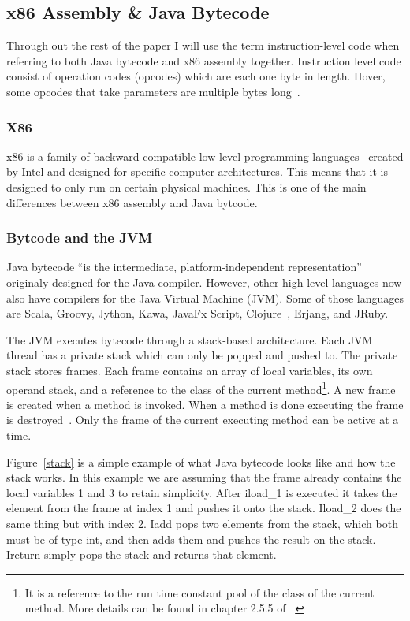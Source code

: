 \documentclass{sig-alternate}
\begin{document}
\subsection{x86 Assembly \& Java Bytecode}


Through out the rest of the paper I will use the term instruction-level code when referring to both Java bytecode and x86 assembly together. Instruction level code consist of operation codes (opcodes) which are each one byte in length. Hover, some opcodes that take parameters are multiple bytes long~\cite{JavaBytecode:2014,x86tomachine:2013}.

\subsubsection{X86}
x86 is a family of backward compatible low-level programming languages~\cite{x86assembly:2014} created by Intel and designed for specific computer architectures. This means that it is designed to only run on certain physical machines. This is one of the main differences between x86 assembly and Java bytcode. 

\subsubsection{ Bytcode and the JVM}
Java bytecode ``is the intermediate, platform-independent representation''~\cite{FINCH2:2009} originaly designed for the Java compiler. However, other high-level languages now also have compilers for the Java Virtual Machine (JVM). Some of those languages are Scala, Groovy, Jython, Kawa, JavaFx Script, Clojure~\cite{FINCH:2011}, Erjang, and JRuby.

The JVM executes bytecode through a stack-based architecture. Each JVM thread has a private stack which can only be popped and pushed to. The private stack stores frames. Each frame contains an array of local variables, its own operand stack, and a reference to the class of the current method\footnote{It is a reference to the run time constant pool of the class of the current method. More details can be found in chapter 2.5.5 of ~\cite{JVMspec:2013}}. A new frame is created when a method is invoked. When a method is done executing the frame is destroyed~\cite{Oracle:2013}. Only the frame of the current executing method can be active at a time.

Figure~\ref{stack} is a simple example of what Java bytecode looks like and how the stack works. In this example we are assuming that the frame already contains the local variables 1 and 3 to retain simplicity. After iload\_1 is executed it takes the element from the frame at index 1 and pushes it onto the stack. Iload\_2 does the same thing but with index 2. Iadd pops two elements from the stack, which both must be of type int, and then adds them and pushes the result on the stack. Ireturn simply pops the stack and returns that element. 
\end{document}
